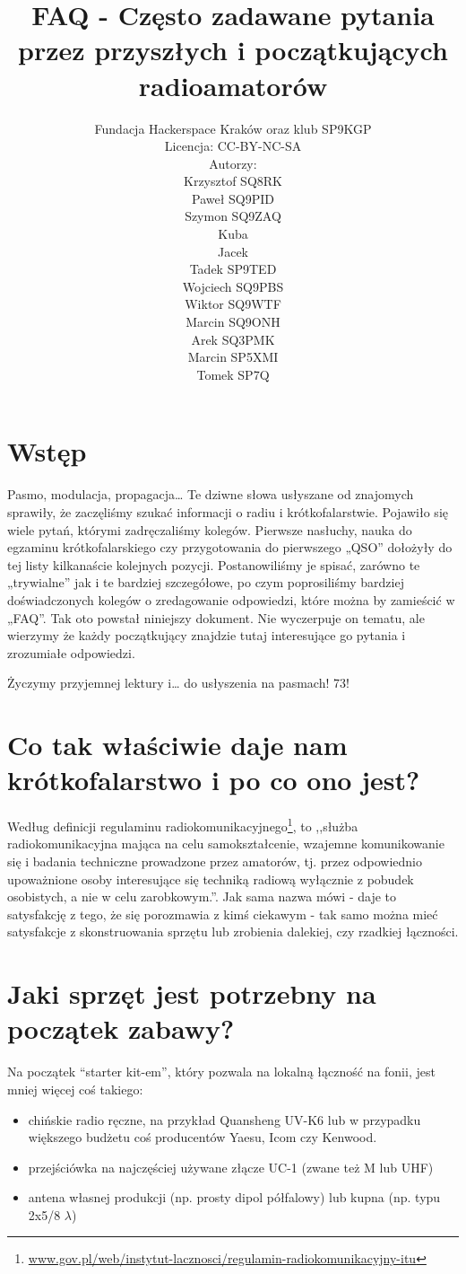 \documentclass[a4paper,12pt]{article}
\title{\textbf{FAQ - Często zadawane pytania przez przyszłych i początkujących radioamatorów}}
\author{Fundacja Hackerspace Kraków
oraz klub SP9KGP\\
Licencja: CC-BY-NC-SA\\
\vspace{1ex}
Autorzy:\\
Krzysztof SQ8RK\\
Paweł SQ9PID\\
Szymon SQ9ZAQ\\
Kuba\\
Jacek\\
Tadek SP9TED\\
Wojciech SQ9PBS\\
Wiktor SQ9WTF\\
Marcin SQ9ONH\\
Arek SQ3PMK\\
Marcin SP5XMI\\
Tomek SP7Q}
\begin{document}
\maketitle

\newpage
\newpage

\section{Wstęp}
Pasmo, modulacja, propagacja… Te dziwne słowa usłyszane od znajomych sprawiły, że zaczęliśmy szukać informacji o radiu i krótkofalarstwie. Pojawiło się wiele pytań, którymi zadręczaliśmy kolegów. Pierwsze nasłuchy, nauka do egzaminu krótkofalarskiego czy przygotowania do pierwszego „QSO” dołożyły do tej listy kilkanaście kolejnych pozycji. Postanowiliśmy je spisać, zarówno te „trywialne” jak i te bardziej szczegółowe, po czym poprosiliśmy bardziej doświadczonych kolegów o zredagowanie odpowiedzi, które można by zamieścić w „FAQ”. Tak oto powstał niniejszy dokument. Nie wyczerpuje on tematu, ale wierzymy że każdy początkujący znajdzie tutaj interesujące go pytania i zrozumiałe odpowiedzi. 

Życzymy przyjemnej lektury i… do usłyszenia na pasmach! 73!

\section{Co tak właściwie daje nam krótkofalarstwo i po co ono jest?}
Według definicji regulaminu radiokomunikacyjnego\footnote{\url{www.gov.pl/web/instytut-lacznosci/regulamin-radiokomunikacyjny-itu}}, to ,,służba radiokomunikacyjna mająca na celu samokształcenie,
wzajemne komunikowanie się i badania techniczne prowadzone przez amatorów, tj. przez odpowiednio upoważnione osoby interesujące się techniką radiową wyłącznie z pobudek osobistych,
a nie w celu zarobkowym.''. Jak sama nazwa mówi - daje to satysfakcję z tego, że się porozmawia z kimś ciekawym - tak samo można mieć satysfakcje z skonstruowania sprzętu lub zrobienia dalekiej, czy rzadkiej łączności.

\section{Jaki sprzęt jest potrzebny na początek zabawy?}
Na początek  “starter kit-em”, który pozwala na lokalną łączność na fonii, jest mniej więcej coś takiego:
\begin{itemize}
 \item chińskie radio ręczne, na przykład Quansheng UV-K6 lub w przypadku większego budżetu coś producentów Yaesu, Icom czy Kenwood. 
 \item przejściówka na najczęściej używane złącze UC-1 (zwane też M lub UHF)
 \item antena własnej produkcji (np. prosty dipol półfalowy) lub kupna (np. typu 2x5/8 \(\lambda\))
\end{itemize}
\end{document}

